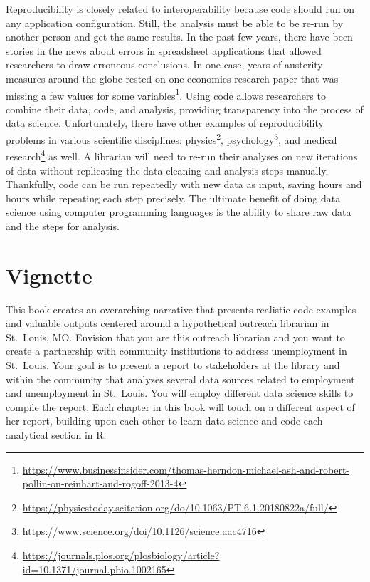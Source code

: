 \documentclass[
  krantz2]{krantz}
\begin{document}
Reproducibility is closely related to interoperability because code should run on any application configuration. Still, the analysis must be able to be re-run by another person and get the same results. In the past few years, there have been stories in the news about errors in spreadsheet applications that allowed researchers to draw erroneous conclusions. In one case, years of austerity measures around the globe rested on one economics research paper that was missing a few values for some variables\footnote{\url{https://www.businessinsider.com/thomas-herndon-michael-ash-and-robert-pollin-on-reinhart-and-rogoff-2013-4}}. Using code allows researchers to combine their data, code, and analysis, providing transparency into the process of data science. Unfortunately, there have other examples of reproducibility problems in various scientific disciplines: physics\footnote{\url{https://physicstoday.scitation.org/do/10.1063/PT.6.1.20180822a/full/}}, psychology\footnote{\url{https://www.science.org/doi/10.1126/science.aac4716}}, and medical research\footnote{\url{https://journals.plos.org/plosbiology/article?id=10.1371/journal.pbio.1002165}} as well. A librarian will need to re-run their analyses on new iterations of data without replicating the data cleaning and analysis steps manually. Thankfully, code can be run repeatedly with new data as input, saving hours and hours while repeating each step precisely. The ultimate benefit of doing data science using computer programming languages is the ability to share raw data and the steps for analysis.

\hypertarget{vignette}{%
\section{Vignette}\label{vignette}}

This book creates an overarching narrative that presents realistic code examples and valuable outputs centered around a hypothetical outreach librarian in St.~Louis, MO. Envision that you are this outreach librarian and you want to create a partnership with community institutions to address unemployment in St.~Louis. Your goal is to present a report to stakeholders at the library and within the community that analyzes several data sources related to employment and unemployment in St.~Louis. You will employ different data science skills to compile the report. Each chapter in this book will touch on a different aspect of her report, building upon each other to learn data science and code each analytical section in R.
\end{document}
